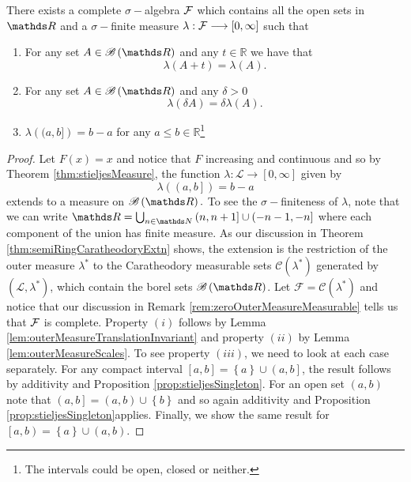\begin{thm}
\label{thm:existenceLebesgueR}There exists a complete $\sigma-$algebra
$\mathcal{F}$ which contains all the open sets in $\R$ and a $\sigma-$finite
measure $\lambda:\mathcal{F}\longrightarrow\left[0,\infty\right]$ such that

\begin{enumerate}[label=(\roman*),leftmargin=.1\linewidth,rightmargin=.4\linewidth]
	\item For any set $A \in \borel\left(\R\right)$ and any $t\in\mathbb{R}$ we have that 
    \[
			\lambda\left(A+t\right) = \lambda\left(A\right).
    \]
	\item For any set $A \in \borel\left(\R\right)$ and any $\delta > 0$
	\[
		\lambda\left(\delta A\right) = \delta \lambda\left(A\right).
	\]

	\item $\lambda\left((a,b]\right) = b - a $ for any $a \leq b \in \mathds{R}$\footnote{The intervals could be open, closed or neither.}

\end{enumerate}
\end{thm}

\begin{proof}
Let $F\left(x\right)=x$ and notice that $F$ increasing and continuous
and so by Theorem \ref{thm:stieljesMeasure}, the function $\lambda:\mathcal{L}\to\left[0,\infty\right]$
given by
\[
\lambda\left(\left(a,b\right]\right)=b-a
\]
extends to a measure on $\borel\left(\R\right).$ To see the $\sigma-$finiteness
of $\lambda$, note that we can write $\R=\bigcup_{n\in\N}\left(n,n+1\right]\cup\left(-n-1,-n\right]$
where each component of the union has finite measure. As our discussion
in Theorem \ref{thm:semiRingCaratheodoryExtn} shows, the extension
is the restriction of the outer measure $\lambda^{*}$ to the Caratheodory
measurable sets $\mathcal{C}\left(\lambda^{*}\right)$ generated by
$\left(\mathcal{L},\lambda^{*}\right)$, which contain the borel sets
$\borel\left(\R\right)$. Let $\mathcal{F}=\mathcal{C}\left(\lambda^{*}\right)$
and notice that our discussion in Remark \ref{rem:zeroOuterMeasureMeasurable}
tells us that $\mathcal{F}$ is complete. Property $\left(i\right)$ follows
by Lemma \ref{lem:outerMeasureTranslationInvariant} and property
$\left(ii\right)$ by Lemma \ref{lem:outerMeasureScales}. To see
property $(iii)$, we need to look at each case separately. For any
compact interval $\left[a,b\right]=\left\{ a\right\} \cup\left(a,b\right]$,
the result follows by additivity and Proposition \ref{prop:stieljesSingleton}.
For an open set $\left(a,b\right)$ note that $\left(a,b\right]=\left(a,b\right)\cup\left\{ b\right\} $
and so again additivity and Proposition \ref{prop:stieljesSingleton}applies.
Finally, we show the same result for $\left[a,b\right)=\left\{ a\right\} \cup\left(a,b\right)$.
\end{proof}

